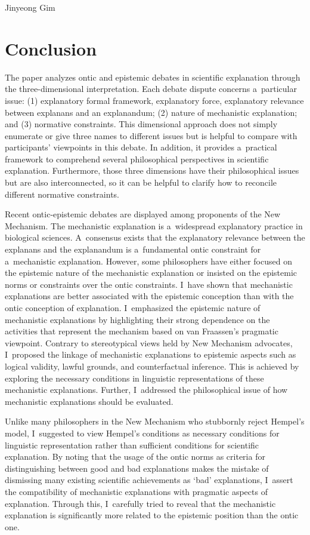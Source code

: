 \begin{artengenv}{Jinyeong Gim}
\section{Conclusion}
The paper analyzes ontic and epistemic debates in scientific explanation through the three-dimensional interpretation. Each debate dispute concerns a~particular issue: (1) explanatory formal framework, explanatory force, explanatory relevance between explanans and an explanandum; (2) nature of mechanistic explanation; and (3) normative constraints. This dimensional approach does not simply enumerate or give three names to different issues but is helpful to compare with participants' viewpoints in this debate. In addition, it provides a~practical framework to comprehend several philosophical perspectives in scientific explanation. Furthermore, those three dimensions have their philosophical issues but are also interconnected, so it can be helpful to clarify how to reconcile different normative constraints.

Recent ontic-epistemic debates are displayed among proponents of the New Mechanism. The mechanistic explanation is a~widespread explanatory practice in biological sciences. A~consensus exists that the explanatory relevance between the explanans and the explanandum is a~fundamental ontic constraint for a~mechanistic explanation. However, some philosophers have either focused on the epistemic nature of the mechanistic explanation or insisted on the epistemic norms or constraints over the ontic constraints. I~have shown that mechanistic explanations are better associated with the epistemic conception than with the ontic conception of explanation. I~emphasized the epistemic nature of mechanistic explanations by highlighting their strong dependence on the activities that represent the mechanism based on van Fraassen's pragmatic viewpoint. Contrary to stereotypical views held by New Mechanism advocates, I~proposed the linkage of mechanistic explanations to epistemic aspects such as logical validity, lawful grounds, and counterfactual inference. This is achieved by exploring the necessary conditions in linguistic representations of these mechanistic explanations. Further, I~addressed the philosophical issue of how mechanistic explanations should be evaluated.

Unlike many philosophers in the New Mechanism who stubbornly reject Hempel's model, I~suggested to view Hempel's conditions as necessary conditions for linguistic representation rather than sufficient conditions for scientific explanation. By noting that the usage of the ontic norms as criteria for distinguishing between good and bad explanations makes the mistake of dismissing many existing scientific achievements as ‘bad' explanations, I~assert the compatibility of mechanistic explanations with pragmatic aspects of explanation. Through this, I~carefully tried to reveal that the mechanistic explanation is significantly more related to the epistemic position than the ontic one.

\end{artengenv}
